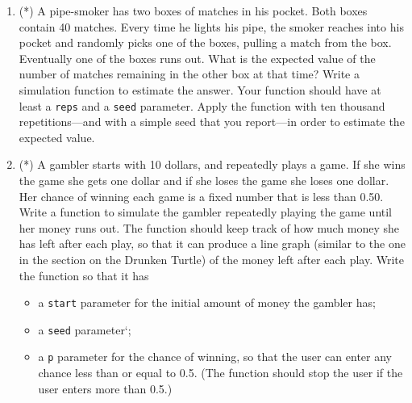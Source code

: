 \documentclass[]{book}
\makeatletter
\newenvironment{Shaded}{\begin{snugshade}}{\end{snugshade}}
\newcommand{\KeywordTok}[1]{\textcolor[rgb]{0.13,0.29,0.53}{\textbf{#1}}}
\newcommand{\DataTypeTok}[1]{\textcolor[rgb]{0.13,0.29,0.53}{#1}}
\newcommand{\DecValTok}[1]{\textcolor[rgb]{0.00,0.00,0.81}{#1}}
\newcommand{\FloatTok}[1]{\textcolor[rgb]{0.00,0.00,0.81}{#1}}
\newcommand{\StringTok}[1]{\textcolor[rgb]{0.31,0.60,0.02}{#1}}
\newcommand{\CommentTok}[1]{\textcolor[rgb]{0.56,0.35,0.01}{\textit{#1}}}
\newcommand{\ControlFlowTok}[1]{\textcolor[rgb]{0.13,0.29,0.53}{\textbf{#1}}}
\newcommand{\OperatorTok}[1]{\textcolor[rgb]{0.81,0.36,0.00}{\textbf{#1}}}
\newcommand{\NormalTok}[1]{#1}
\providecommand{\tightlist}{%
  \setlength{\itemsep}{0pt}\setlength{\parskip}{0pt}}
\newenvironment{kframe}{%
\medskip{}
\setlength{\fboxsep}{.8em}
 \def\at@end@of@kframe{}%
 \ifinner\ifhmode%
  \def\at@end@of@kframe{\end{minipage}}%
  \begin{minipage}{\columnwidth}%
 \fi\fi%
 \def\FrameCommand##1{\hskip\@totalleftmargin \hskip-\fboxsep
 \colorbox{shadecolor}{##1}\hskip-\fboxsep
     \hskip-\linewidth \hskip-\@totalleftmargin \hskip\columnwidth}%
 \MakeFramed {\advance\hsize-\width
   \@totalleftmargin\z@ \linewidth\hsize
   \@setminipage}}%
 {\par\unskip\endMakeFramed%
 \at@end@of@kframe}
\renewenvironment{Shaded}{\begin{kframe}}{\end{kframe}}
\theoremstyle{definition}
\theoremstyle{definition}
\theoremstyle{definition}
\theoremstyle{remark}
\makeatother
\begin{document}
{\begin{enumerate}
\begin{Shaded}
\begin{Highlighting}[]
\NormalTok{targets <-}\StringTok{ }\KeywordTok{seq}\NormalTok{(}\FloatTok{0.05}\NormalTok{, }\FloatTok{0.95}\NormalTok{, }\DataTypeTok{by =} \FloatTok{0.05}\NormalTok{)}
\NormalTok{n <-}\StringTok{ }\KeywordTok{length}\NormalTok{(targets)}
\NormalTok{results <-}\StringTok{ }\KeywordTok{numeric}\NormalTok{(n)}
\KeywordTok{set.seed}\NormalTok{(}\DecValTok{3030}\NormalTok{) }\CommentTok{# or some other simple seed that you like}
\ControlFlowTok{for}\NormalTok{ ( i }\ControlFlowTok{in} \DecValTok{1}\OperatorTok{:}\NormalTok{n ) \{}
  \CommentTok{# use numberNeededSim() with:}
  \CommentTok{#    * 10000 reps}
  \CommentTok{#    * seed left at the default NULL (you provided one already)}
  \CommentTok{#    * target set to targets[i]}
  \CommentTok{#    * report left at FALSE (no need to have R talk to you at each step)}
  \CommentTok{# make sure to store the estimate in results[i]}
\NormalTok{\}}
\CommentTok{# after the loop, you can compare results with exp(targets)}
\end{Highlighting}
\end{Shaded}
\item
  (*) A pipe-smoker has two boxes of matches in his pocket. Both boxes
  contain 40 matches. Every time he lights his pipe, the smoker reaches
  into his pocket and randomly picks one of the boxes, pulling a match
  from the box. Eventually one of the boxes runs out. What is the
  expected value of the number of matches remaining in the other box at
  that time? Write a simulation function to estimate the answer. Your
  function should have at least a \texttt{reps} and a \texttt{seed}
  parameter. Apply the function with ten thousand repetitions---and with
  a simple seed that you report---in order to estimate the expected
  value.
\item
  (*) A gambler starts with 10 dollars, and repeatedly plays a game. If
  she wins the game she gets one dollar and if she loses the game she
  loses one dollar. Her chance of winning each game is a fixed number
  that is less than 0.50. Write a function to simulate the gambler
  repeatedly playing the game until her money runs out. The function
  should keep track of how much money she has left after each play, so
  that it can produce a line graph (similar to the one in the section on
  the Drunken Turtle) of the money left after each play. Write the
  function so that it has

  \begin{itemize}
  \tightlist
  \item
    a \texttt{start} parameter for the initial amount of money the
    gambler has;
  \item
    a \texttt{seed} parameter`;
  \item
    a \texttt{p} parameter for the chance of winning, so that the user
    can enter any chance less than or equal to 0.5. (The function should
    stop the user if the user enters more than 0.5.)
  \end{itemize}


\end{enumerate}}
\end{document}
